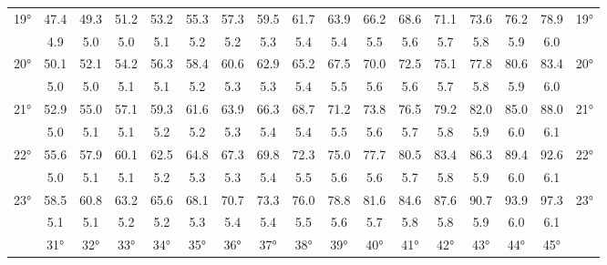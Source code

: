 \begin{scriptsize}
\begin{tabular}{c || c | c | c | c | c | c | c | c | c | c | c | c | c | c | c || c}
		\multirow{2}{*}{19°}&47.4&49.3&51.2&53.2&55.3&57.3&59.5&61.7&63.9&66.2&68.6&71.1&73.6&76.2&78.9&\multirow{2}{*}{19°}\\ \space&4.9&5.0&5.0&5.1&5.2&5.2&5.3&5.4&5.4&5.5&5.6&5.7&5.8&5.9&6.0&\space\\\hline
		\multirow{2}{*}{20°}&50.1&52.1&54.2&56.3&58.4&60.6&62.9&65.2&67.5&70.0&72.5&75.1&77.8&80.6&83.4&\multirow{2}{*}{20°}\\ \space&5.0&5.0&5.1&5.1&5.2&5.3&5.3&5.4&5.5&5.6&5.6&5.7&5.8&5.9&6.0&\space\\\hline
		\multirow{2}{*}{21°}&52.9&55.0&57.1&59.3&61.6&63.9&66.3&68.7&71.2&73.8&76.5&79.2&82.0&85.0&88.0&\multirow{2}{*}{21°}\\ \space&5.0&5.1&5.1&5.2&5.2&5.3&5.4&5.4&5.5&5.6&5.7&5.8&5.9&6.0&6.1&\space\\\hline
		\multirow{2}{*}{22°}&55.6&57.9&60.1&62.5&64.8&67.3&69.8&72.3&75.0&77.7&80.5&83.4&86.3&89.4&92.6&\multirow{2}{*}{22°}\\ \space&5.0&5.1&5.1&5.2&5.3&5.3&5.4&5.5&5.6&5.6&5.7&5.8&5.9&6.0&6.1&\space\\\hline
		\multirow{2}{*}{23°}&58.5&60.8&63.2&65.6&68.1&70.7&73.3&76.0&78.8&81.6&84.6&87.6&90.7&93.9&97.3&\multirow{2}{*}{23°}\\ \space&5.1&5.1&5.2&5.2&5.3&5.4&5.4&5.5&5.6&5.7&5.8&5.8&5.9&6.0&6.1&\space\\\hline
		\hline\space &31°&32°&33°&34°&35°&36°&37°&38°&39°&40°&41°&42°&43°&44°&45°
\end{tabular}\end{scriptsize}

